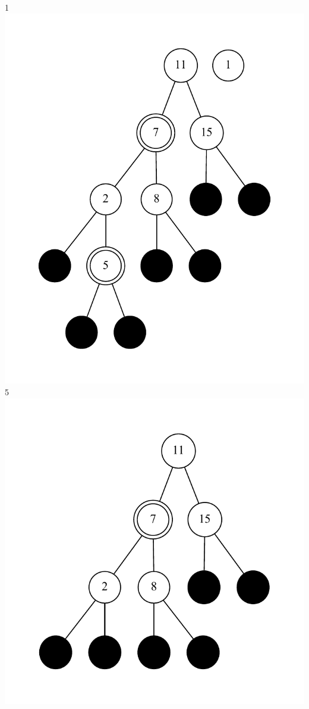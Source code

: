 \documentclass[11pt]{article}
\begin{document}
	1\\
\includegraphics{bstep2.pdf}\\
	5\\
\includegraphics{bstep3.pdf}\\
\end{document}
